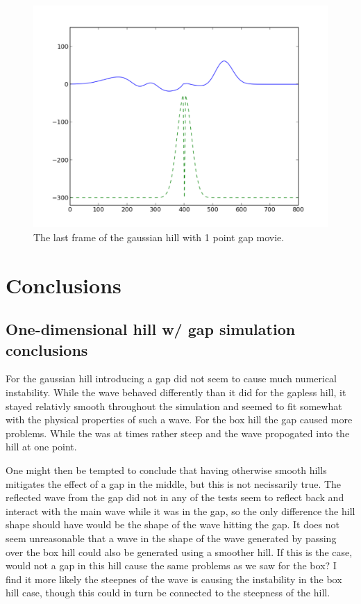 \documentclass[twoside]{article}
\begin{document}
\begin{figure} 
  \centering
  \includegraphics[scale=0.4]{PdfImages/1d_gaussian_slit1_280.pdf}
  \caption{The last frame of the gaussian hill with 1 point gap movie.} \label{fig:box_1d_narrow}
\end{figure}

\section{Conclusions}

\subsection{One-dimensional hill w/ gap simulation conclusions}
For the gaussian hill introducing a gap did not seem to cause much numerical instability. While the wave behaved differently than it did for the gapless hill, it stayed relativly smooth throughout the simulation and seemed to fit somewhat with the physical properties of such a wave. For the box hill the gap caused more problems. While the was at times rather steep and the wave propogated into the hill at one point.

One might then be tempted to conclude that having otherwise smooth hills mitigates the effect of a gap in the middle, but this is not necissarily true. The reflected wave from the gap did not in any of the tests seem to reflect back and interact with the main wave while it was in the gap, so the only difference the hill shape should have would be the shape of the wave hitting the gap. It does not seem unreasonable that a wave in the shape of the wave generated by passing over the box hill could also be generated using a smoother hill. If this is the case, would not a gap in this hill cause the same problems as we saw for the box? I find it more likely the steepnes of the wave is causing the instability in the box hill case, though this could in turn be connected to the steepness of the hill.
\end{document}
